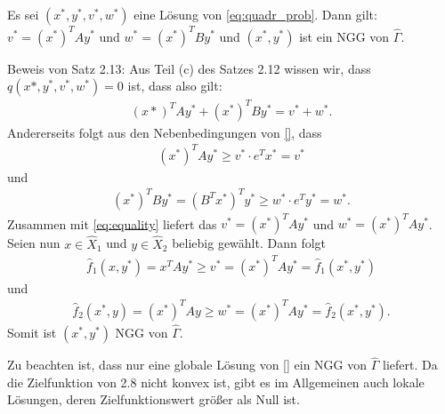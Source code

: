 \begin{satz}
Es sei $(x^{*}, y^{*}, v^{*}, w^{*})$ eine Lösung von \eqref{eq:quadr_prob}. Dann gilt: $v^{*} = (x^{*})^{T} Ay^{*}$ und $w^{*} = (x^{*})^{T} By^{*}$ und $(x^{*}, y^{*})$ ist ein NGG von $\hat\Gamma$.
\end{satz}
\begin{beweis}
Beweis von Satz 2.13: Aus Teil (c) des Satzes 2.12 wissen wir, dass $q(x*, y^{*}, v^{*}, w^{*}) = 0$ ist, dass also gilt:  
\begin{align}\label{eq:equality}
  (x*)^{T}Ay^{*} + (x^{*})^{T}By^{*} =  v^{*}+ w^{*}.
\end{align}
Andererseits folgt aus den Nebenbedingungen von \eqref{}, dass
\begin{align*}
  (x^{*})^{T}Ay^{*} \geq v^{*}\cdot e^{T}x^{*} = v^{*}
\end{align*}
und 
\begin{align*}
  (x^{*})^{T}By^{*} = (B^{T}x^{*})^{T} y^{*} \geq w^{*}\cdot e^{T}y^{*} = w^{*}. 
\end{align*}
Zusammen mit \eqref{eq:equality} liefert das $v^{*} = (x^{*})^{T}Ay^{*}$ und $w^{*} = (x^{*})^{T}Ay^{*}$. Seien nun $x \in \hat X_{1}$ und $y \in \hat X_{2}$ beliebig gewählt. Dann folgt
\begin{align*}
  \hat f_{1} (x, y^{*}) = x^{T}Ay^{*} \geq v^{*} = (x^{*})^{T}Ay^{*} = \hat f_{1}(x^{*}, y^{*})
\end{align*}
und
\begin{align*}
  \hat f_{2} (x^{*}, y) = (x^{*})^{T}Ay \geq w^{*} = (x^{*})^{T}Ay^{*} = \hat f_{2}(x^{*}, y^{*}).
\end{align*}
Somit ist $(x^{*}, y^{*})$ NGG von $\hat \Gamma$. 
\end{beweis}
\begin{bemerkung*}
  Zu beachten ist, dass nur eine globale Lösung von \eqref{} ein NGG von $\hat \Gamma$ liefert. Da die Zielfunktion von 2.8 nicht konvex ist, gibt es im Allgemeinen auch lokale Lösungen, deren Zielfunktionswert größer als Null ist. 
\end{bemerkung*}
